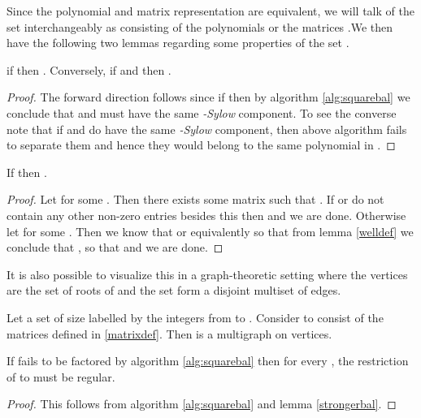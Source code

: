 Since the polynomial and matrix representation are equivalent, we will talk of the set  interchangeably as consisting of the polynomials  or the matrices .We then have the following two lemmas regarding some
properties of the set .

\begin{lemma} \label{welldef}
	 if  then . Conversely, if  and
	 then .
\end{lemma}

\begin{proof}
	The forward direction follows since if  then by algorithm \ref{alg:squarebal} we conclude that  and  must have the same \emph{-Sylow} component. To see the
	converse note that if  and  do have the same 
	\emph{-Sylow} component, then above algorithm fails to separate them and hence they would belong to the same polynomial in .
\end{proof}


\begin{lemma}\label{transpose}
	If  then .
\end{lemma}

\begin{proof}
	Let   for some . Then there exists some matrix  such that . If  or  do not contain any other non-zero entries besides this then  and we are done.
	Otherwise let  for some . Then we know that  or equivalently  so that from lemma \ref{welldef} we conclude that 
	, so that  and we are done.
\end{proof}


It is also possible to visualize this in a graph-theoretic setting where the vertices
are the set of roots of  and the set  form a disjoint multiset of edges.

\begin{definition}\label{multigraph}
	Let  a set of size  labelled by the integers from  to . Consider  to consist of the matrices  defined in \ref{matrixdef}. Then  is a multigraph on  vertices.
\end{definition}

\begin{lemma}
      If  fails to be factored by algorithm \ref{alg:squarebal} then for every , the restriction of  to  must be regular.
\end{lemma}

\begin{proof}
	This follows from algorithm \ref{alg:squarebal} and lemma \ref{strongerbal}.
\end{proof}


